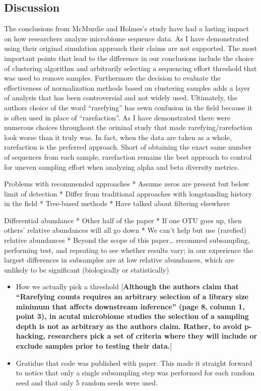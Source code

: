 \documentclass[
]{article}
\begin{document}
\hypertarget{discussion}{%
\subsection{Discussion}\label{discussion}}

The conclusions from McMurdie and Holmes's study have had a lasting
impact on how researchers analyze microbiome sequence data. As I have
demonstrated using their original simulation approach their claims are
not supported. The most important points that lead to the difference in
our conclusions include the choice of clustering algorithm and
arbitrarily selecting a sequencing effort threshold that was used to
remove samples. Furthermore the decision to evaluate the effectiveness
of normalization methods based on clustering samples adds a layer of
analysis that has been controversial and not widely used. Ultimately,
the authors choice of the word ``rarefying'' has sewn confusion in the
field because it is often used in place of ``rarefaction''. As I have
demonstrated there were numerous choices throughout the orininal study
that made rarefying/rarefaction look worse than it truly was. In fact,
when the data are taken as a whole, rarefaction is the preferred
approach. Short of obtaining the exact same number of sequences from
each sample, rarefaction remains the best approach to control for uneven
sampling effort when analyzing alpha and beta diversity metrics.

Problems with recommended approaches * Assume zeros are present but
below limit of detection * Differ from traditional approaches with
longstanding history in the field * Tree-based methods * Have talked
about filtering elsewhere

Differential abundance * Other half of the paper * If one OTU goes up,
then others' relative abundances will all go down * We can't help but
use (rarefied) relative abundances * Beyond the scope of this
paper\ldots{} recommed subsampling, performing test, and repeating to
see whether results vary; in our experience the largest differences in
subsamples are at low relative abundances, which are unlikely to be
significant (biologically or statistically)

\begin{itemize}
\item
  How we actually pick a threshold {[}\textbf{Although the authors claim
  that ``Rarefying counts requires an arbitrary selection of a library
  size minimum that affects downstream inference'' (page 8, column 1,
  point 3), in acutal microbiome studies the selection of a sampling
  depth is not as arbitrary as the authors claim. Rather, to avoid
  p-hacking, researchers pick a set of criteria where they will include
  or exclude samples prior to testing their data.}{]}
\item
  Gratidue that code was published with paper. This made it straight
  forward to notice that only a single subsampling step was performed
  for each random seed and that only 5 random seeds were used.
\end{itemize}
\end{document}
